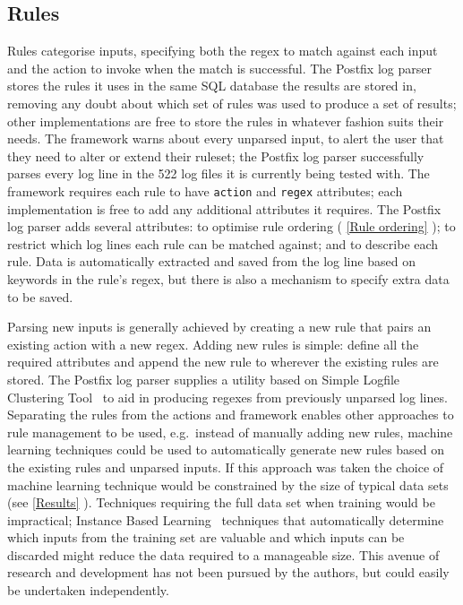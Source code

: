 \documentclass{svmult}
\newcommand{\sectionref}[1]{%
    \textsection{}\vref*{#1}%
}
\newcommand{\numberOFlogFILESall}[0]{%
    522%
}
\begin{document}
\subsection{Rules}

\label{Rules}

Rules categorise inputs, specifying both the regex to match against each
input and the action to invoke when the match is successful.  The Postfix
log parser stores the rules it uses in the same SQL database the results
are stored in, removing any doubt about which set of rules was used to
produce a set of results; other implementations are free to store the rules
in whatever fashion suits their needs.  The framework warns about every
unparsed input, to alert the user that they need to alter or extend their
ruleset; the Postfix log parser successfully parses every log line in the
\numberOFlogFILESall{} log files it is currently being tested with.  The
framework requires each rule to have \texttt{action} and \texttt{regex}
attributes; each implementation is free to add any additional attributes it
requires.  The Postfix log parser adds several attributes: to optimise rule
ordering (\sectionref{Rule ordering}); to restrict which log lines each
rule can be matched against; and to describe each rule.  Data is
automatically extracted and saved from the log line based on keywords in
the rule's regex, but there is also a mechanism to specify extra data to be
saved.

Parsing new inputs is generally achieved by creating a new rule that pairs
an existing action with a new regex.  Adding new rules is simple: define
all the required attributes and append the new rule to wherever the
existing rules are stored.  The Postfix log parser supplies a utility based
on Simple Logfile Clustering Tool~\cite{slct-paper} to aid in producing
regexes from previously unparsed log lines.  Separating the rules from the
actions and framework enables other approaches to rule management to be
used, e.g.\ instead of manually adding new rules, machine learning
techniques could be used to automatically generate new rules based on the
existing rules and unparsed inputs.  If this approach was taken the choice
of machine learning technique would be constrained by the size of typical
data sets (see \sectionref{Results}).  Techniques requiring the full data
set when training would be impractical; Instance Based
Learning~\cite{instance-based-learning} techniques that automatically
determine which inputs from the training set are valuable and which inputs
can be discarded might reduce the data required to a manageable size.  This
avenue of research and development has not been pursued by the authors, but
could easily be undertaken independently.
\end{document}
